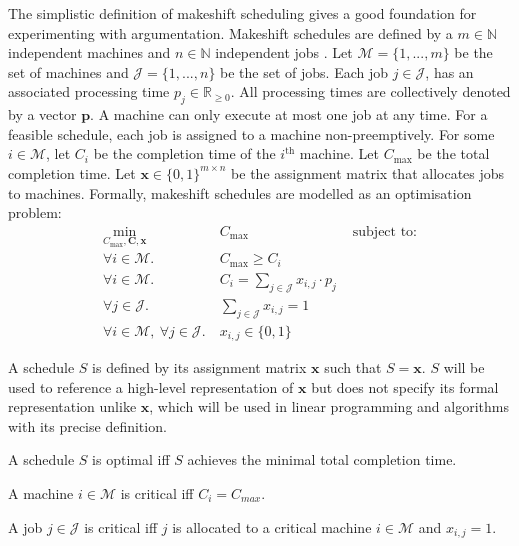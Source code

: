 The simplistic definition of makeshift scheduling gives a good foundation for experimenting with argumentation. Makeshift schedules are defined by a $m\in\mathbb{N}$ independent machines and $n\in\mathbb{N}$ independent jobs \cite{sa}. Let $\mathcal{M}=\{1,...,m\}$ be the set of machines and $\mathcal{J}=\{1,...,n\}$ be the set of jobs. Each job $j\in\mathcal{J}$, has an associated processing time $p_j\in\mathbb{R}_{\geq 0}$. All processing times are collectively denoted by a vector $\mathbf{p}$. A machine can only execute at most one job at any time. For a feasible schedule, each job is assigned to a machine non-preemptively. For some $i\in\mathcal{M}$, let $C_i$ be the completion time of the $i^\text{th}$ machine. Let $C_{\max}$ be the total completion time. Let $\mathbf{x}\in\{0,1\}^{m\times n}$ be the assignment matrix that allocates jobs to machines. Formally, makeshift schedules are modelled as an optimisation problem:
\begin{align*}
	\min_{C_{\max},\mathbf{C},\mathbf{x}}\ &C_{\max}&\text{ subject to:}\\
	\forall i\in\mathcal{M}.\ &C_{\max}\geq C_i\\
	\forall i\in\mathcal{M}.\ &C_i=\sum_{j\in\mathcal{J}}x_{i,j}\cdot p_j\\
	\forall j\in\mathcal{J}.\ &\sum_{j\in\mathcal{J}}x_{i,j}=1\\
	\forall i\in\mathcal{M},\ \forall j\in\mathcal{J}.\ &x_{i,j}\in\{0,1\}
\end{align*}

\begin{definition}
	A schedule $S$ is defined by its assignment matrix $\mathbf{x}$ such that $S=\mathbf{x}$. $S$ will be used to reference a high-level representation of $\mathbf{x}$ but does not specify its formal representation unlike $\mathbf{x}$, which will be used in linear programming and algorithms with its precise definition.
\end{definition}

\begin{definition}
	A schedule $S$ is optimal iff $S$ achieves the minimal total completion time.
\end{definition}


\begin{definition}
	A machine $i\in\mathcal{M}$ is critical iff $C_i=C_{max}$.
\end{definition}

\begin{definition}
	A job $j\in\mathcal{J}$ is critical iff $j$ is allocated to a critical machine $i\in\mathcal{M}$ and $x_{i,j}=1$.
\end{definition}


